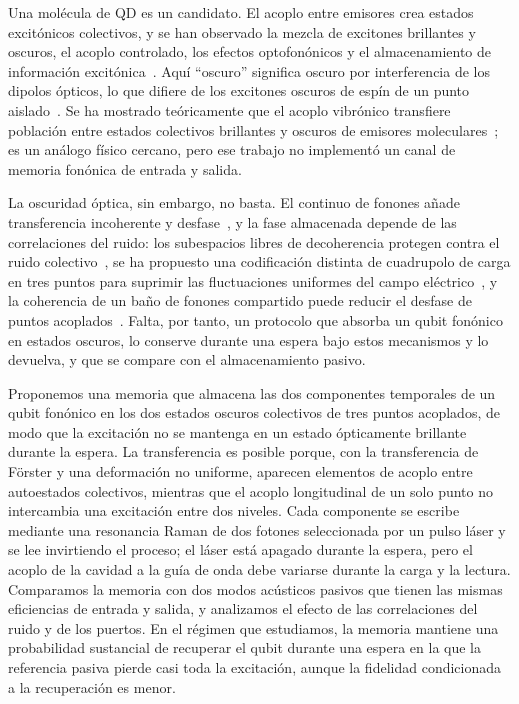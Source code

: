 \documentclass[aps,pra,twocolumn,groupedaddress,amsmath,amssymb,floatfix]{revtex4-2}
\begin{document}
Una mol\'ecula de QD es un candidato. El acoplo entre emisores crea estados excit\'onicos colectivos, y se han observado la mezcla de excitones brillantes y oscuros, el acoplo controlado, los efectos optofon\'onicos y el almacenamiento de informaci\'on excit\'onica~\cite{ortner2003,krenner2005,gerardot2005,skold2013,kerfoot2014,boyerdelagiroday2011,carlson2019}. Aqu\'i ``oscuro'' significa oscuro por interferencia de los dipolos \'opticos, lo que difiere de los excitones oscuros de esp\'in de un punto aislado~\cite{lueker2017}. Se ha mostrado te\'oricamente que el acoplo vibr\'onico transfiere poblaci\'on entre estados colectivos brillantes y oscuros de emisores moleculares~\cite{holzinger2022}; es un an\'alogo f\'isico cercano, pero ese trabajo no implement\'o un canal de memoria fon\'onica de entrada y salida.

La oscuridad \'optica, sin embargo, no basta. El continuo de fonones a\~nade transferencia incoherente y desfase~\cite{rozbicki2008,muljarov2005,sirkina2025,daniels2013}, y la fase almacenada depende de las correlaciones del ruido: los subespacios libres de decoherencia protegen contra el ruido colectivo~\cite{lidar1998}, se ha propuesto una codificaci\'on distinta de cuadrupolo de carga en tres puntos para suprimir las fluctuaciones uniformes del campo el\'ectrico~\cite{friesen2017}, y la coherencia de un ba\~no de fonones compartido puede reducir el desfase de puntos acoplados~\cite{hall2025}. Falta, por tanto, un protocolo que absorba un qubit fon\'onico en estados oscuros, lo conserve durante una espera bajo estos mecanismos y lo devuelva, y que se compare con el almacenamiento pasivo.

Proponemos una memoria que almacena las dos componentes temporales de un qubit fon\'onico en los dos estados oscuros colectivos de tres puntos acoplados, de modo que la excitaci\'on no se mantenga en un estado \'opticamente brillante durante la espera. La transferencia es posible porque, con la transferencia de F\"orster y una deformaci\'on no uniforme, aparecen elementos de acoplo entre autoestados colectivos, mientras que el acoplo longitudinal de un solo punto no intercambia una excitaci\'on entre dos niveles. Cada componente se escribe mediante una resonancia Raman de dos fotones seleccionada por un pulso l\'aser y se lee invirtiendo el proceso; el l\'aser est\'a apagado durante la espera, pero el acoplo de la cavidad a la gu\'ia de onda debe variarse durante la carga y la lectura. Comparamos la memoria con dos modos ac\'usticos pasivos que tienen las mismas eficiencias de entrada y salida, y analizamos el efecto de las correlaciones del ruido y de los puertos. En el r\'egimen que estudiamos, la memoria mantiene una probabilidad sustancial de recuperar el qubit durante una espera en la que la referencia pasiva pierde casi toda la excitaci\'on, aunque la fidelidad condicionada a la recuperaci\'on es menor.
\end{document}
